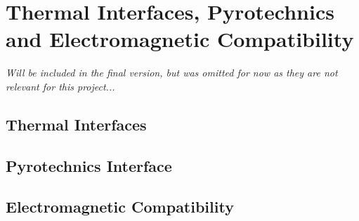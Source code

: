 \chapter{Thermal Interfaces, Pyrotechnics and Electromagnetic Compatibility}
\label{chap:thermal_pyro_emc}

\textit{Will be included in the final version, but was omitted for now as they are not relevant for this project...}

\section{Thermal Interfaces}


\section{Pyrotechnics Interface}


\section{Electromagnetic Compatibility}

